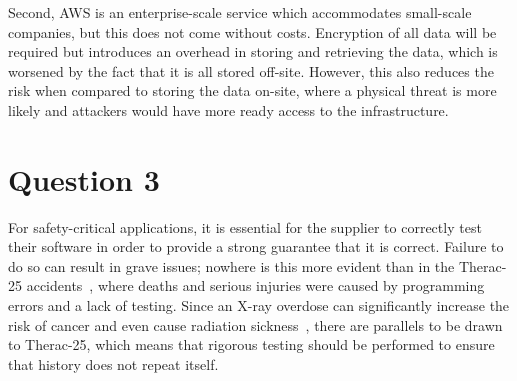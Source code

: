 \documentclass[12pt]{report}
\begin{document}
Second, AWS is an enterprise-scale service which accommodates small-scale companies, but this does not come without costs. Encryption of all data will be required but introduces an overhead in storing and retrieving the data, which is worsened by the fact that it is all stored off-site. However, this also reduces the risk when compared to storing the data on-site, where a physical threat is more likely and attackers would have more ready access to the infrastructure.

\newpage
\section*{Question 3}

For safety-critical applications, it is essential for the supplier to correctly test their software in order to provide a strong guarantee that it is correct. Failure to do so can result in grave issues; nowhere is this more evident than in the Therac-25 accidents~\cite{therac}, where deaths and serious injuries were caused by programming errors and a lack of testing. Since an X-ray overdose can significantly increase the risk of cancer and even cause radiation sickness~\cite{rad}, there are parallels to be drawn to Therac-25, which means that rigorous testing should be performed to ensure that history does not repeat itself.
\end{document}
